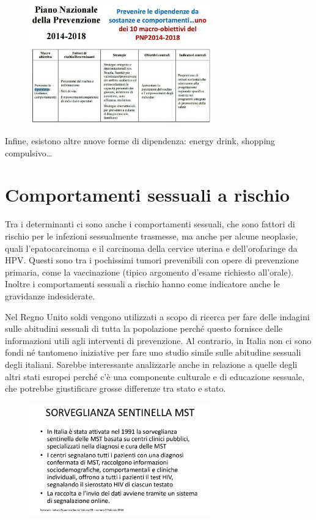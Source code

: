 \begin{figure}[!ht]
\centering
	\includegraphics[width=0.7\textwidth]{18/image10.jpeg}
\end{figure}


Infine, esistono altre nuove forme di dipendenza: energy drink, shopping
compulsivo\ldots{}

\section{Comportamenti sessuali a rischio}


Tra i determinanti ci sono anche i comportamenti sessuali, che sono
fattori di rischio per le infezioni sessualmente trasmesse, ma anche per
alcune neoplasie, quali l'epatocarcinoma e il carcinoma della cervice
uterina e dell'orofaringe da HPV. Questi sono tra i pochissimi tumori
prevenibili con opere di prevenzione primaria, come la vaccinazione
(tipico argomento d'esame richiesto all'orale). Inoltre i comportamenti
sessuali a rischio hanno come indicatore anche le gravidanze
indesiderate.

Nel Regno Unito soldi vengono utilizzati a scopo di ricerca per fare
delle indagini sulle abitudini sessuali di tutta la popolazione perché
questo fornisce delle informazioni utili agli interventi di prevenzione.
Al contrario, in Italia non ci sono fondi né tantomeno iniziative per
fare uno studio simile sulle abitudine sessuali degli italiani. Sarebbe
interessante analizzarle anche in relazione a quelle degli altri stati
europei perché c'è una componente culturale e di educazione sessuale,
che potrebbe giustificare grosse differenze tra stato e stato.

\begin{figure}[!ht]
\centering
	\includegraphics[width=0.7\textwidth]{18/image11.jpeg}
\end{figure}

